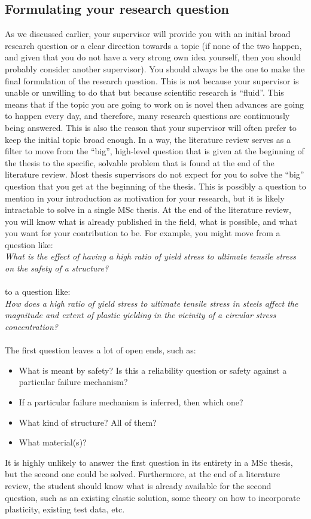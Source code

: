 \documentclass{article}
\begin{document}
\subsection{Formulating your research question}
As we discussed earlier, your supervisor will provide you with an initial broad research question or a clear direction towards a topic (if none of the two happen, and given that you do not have a very strong own idea yourself, then you should probably consider another supervisor). You should always be the one to make the final formulation of the research question. This is not because your supervisor is unable or unwilling to do that but because scientific research is “fluid”. This means that if the topic you are going to work on is novel then advances are going to happen every day, and therefore, many research questions are continuously being answered. This is also the reason that your supervisor will often prefer to keep the initial topic broad enough. In a way, the literature review serves as a filter to move from the “big”, high-level question that is given at the beginning of the thesis to the specific, solvable problem that is found at the end of the literature review. Most thesis supervisors do not expect for you to solve the “big” question that you get at the beginning of the thesis. This is possibly a question to mention in your introduction as motivation for your research, but it is likely intractable to solve in a single MSc thesis. At the end of the literature review, you will know what is already published in the field, what is possible, and what you want for your contribution to be. For example, you might move from a question like:
\\\textit{What is the effect of having a high ratio of yield stress to ultimate tensile stress on the safety of a structure?}
\\\\to a question like:
\\\textit{How does a high ratio of yield stress to ultimate tensile stress in steels affect the magnitude and extent of plastic yielding in the vicinity of a circular stress concentration?}
\\\\The first question leaves a lot of open ends, such as:
\begin{itemize}
    \item What is meant by safety? Is this a reliability question or safety against a particular failure mechanism?
    \item If a particular failure mechanism is inferred, then which one?
    \item What kind of structure? All of them?
    \item What material(s)?
\end{itemize}
It is highly unlikely to answer the first question in its entirety in a MSc thesis, but the second one could be solved. Furthermore, at the end of a literature review, the student should know what is already available for the second question, such as an existing elastic solution, some theory on how to incorporate plasticity, existing test data, etc.
\end{document}
